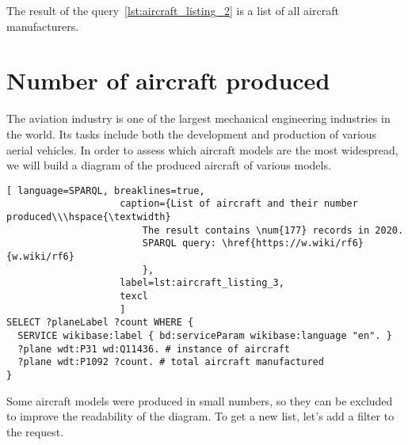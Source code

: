The result of the query~\ref{lst:aircraft_listing_2} is a list of all aircraft manufacturers.


\label{question:aircraft_manufacturers_en}


\section{Number of aircraft produced}

The aviation industry is one of the largest mechanical engineering industries in the world. Its tasks include both the development 
and production of various aerial vehicles. In order to assess which aircraft models are the most widespread, we will build a diagram 
of the produced aircraft of various models.

\begin{lstlisting}[ language=SPARQL, breaklines=true, 
                    caption={List of aircraft and their number produced\\\hspace{\textwidth}
                        The result contains \num{177} records in 2020. 
                        SPARQL query: \href{https://w.wiki/rf6}{w.wiki/rf6}
                        },
                    label=lst:aircraft_listing_3,
                    texcl 
                    ]
SELECT ?planeLabel ?count WHERE {
  SERVICE wikibase:label { bd:serviceParam wikibase:language "en". }
  ?plane wdt:P31 wd:Q11436. # instance of aircraft
  ?plane wdt:P1092 ?count. # total aircraft manufactured
}
\end{lstlisting}

Some aircraft models were produced in small numbers, so they can be excluded to improve the readability of the diagram. 
To get a new list, let's add a filter to the request.

